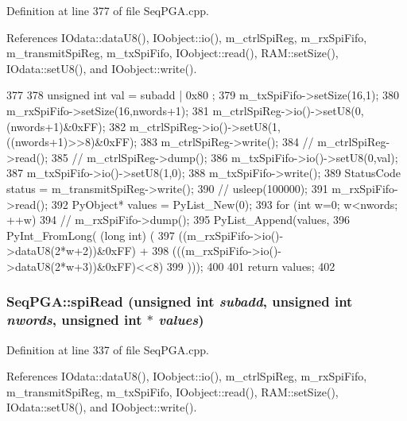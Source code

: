 Definition at line 377 of file SeqPGA.cpp.

References IOdata::dataU8(), IOobject::io(), m\_\-ctrlSpiReg, m\_\-rxSpiFifo, m\_\-transmitSpiReg, m\_\-txSpiFifo, IOobject::read(), RAM::setSize(), IOdata::setU8(), and IOobject::write().


\begin{DoxyCode}
377                                                                    { 
378   unsigned int val = subadd | 0x80 ; 
379   m_txSpiFifo->setSize(16,1);
380   m_rxSpiFifo->setSize(16,nwords+1);
381   m_ctrlSpiReg->io()->setU8(0,(nwords+1)&0xFF);
382   m_ctrlSpiReg->io()->setU8(1,((nwords+1)>>8)&0xFF);
383   m_ctrlSpiReg->write();
384   //  m_ctrlSpiReg->read();
385   //  m_ctrlSpiReg->dump();
386   m_txSpiFifo->io()->setU8(0,val);
387   m_txSpiFifo->io()->setU8(1,0);
388   m_txSpiFifo->write();
389   StatusCode status = m_transmitSpiReg->write();  
390   //  usleep(100000);
391   m_rxSpiFifo->read();
392   PyObject* values = PyList_New(0);
393   for (int w=0; w<nwords; ++w) {
394     //    m_rxSpiFifo->dump();
395    PyList_Append(values,
396           PyInt_FromLong( (long int) (
397                           ((m_rxSpiFifo->io()->dataU8(2*w+2))&0xFF) + 
398                           (((m_rxSpiFifo->io()->dataU8(2*w+3))&0xFF)<<8)
399                           )));
400   }
401   return values;
402 } 
\end{DoxyCode}
\hypertarget{classSeqPGA_ab3d0e5e5d4014bc7a92588a76b8713d4}{
\subsubsection[{spiRead}]{ SeqPGA::spiRead (unsigned int {\em subadd}, \/  unsigned int {\em nwords}, \/  unsigned int $\ast$ {\em values})}}
\label{classSeqPGA_ab3d0e5e5d4014bc7a92588a76b8713d4}


Definition at line 337 of file SeqPGA.cpp.

References IOdata::dataU8(), IOobject::io(), m\_\-ctrlSpiReg, m\_\-rxSpiFifo, m\_\-transmitSpiReg, m\_\-txSpiFifo, IOobject::read(), RAM::setSize(), IOdata::setU8(), and IOobject::write().

